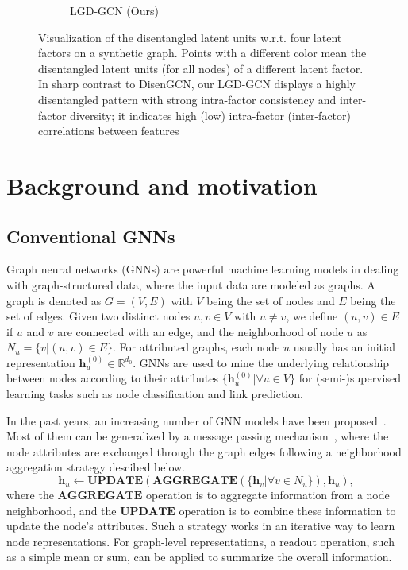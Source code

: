 \documentclass[accepted]{uai2021} %
\begin{document}
\begin{figure}[t]
\begin{subfigure}[b]{0.235\textwidth}
         \caption{\small{LGD-GCN (Ours)}}
         \label{fig:lgd_good}
     \end{subfigure}
\caption{Visualization of the disentangled latent units w.r.t. four latent factors on a synthetic graph. Points with a different color mean the disentangled latent units (for all nodes) of a different latent factor. In sharp contrast to DisenGCN, our LGD-GCN displays a highly disentangled pattern with strong intra-factor consistency and inter-factor diversity; it indicates high (low) intra-factor (inter-factor) correlations between features}
\label{fig:DisentangleSensi}
\end{figure}

\section{Background and motivation}
\subsection{Conventional GNNs}
Graph neural networks (GNNs) are powerful machine learning models in dealing with graph-structured data, where the input data are modeled as graphs. A graph is denoted as $G = (V, E)$ with $V$ being the set of nodes and $E$ being the set of edges. Given two distinct nodes $u, v \in V$ with $u \neq v$, we define $(u, v) \in E$ if $u$ and $v$ are connected with an edge, and the neighborhood of node $u$ as $N_u = \{v|(u,v) \in E\}$. For attributed graphs, each node $u$ usually has an initial representation $\mathbf{h}_u^{(0)} \in \mathbb{R}^{d_{0}}$. GNNs are used to mine the underlying relationship between nodes according to their attributes $\{\mathbf{h}_u^{(0)}| \forall u \in V \}$ for (semi-)supervised learning tasks such as node classification and link prediction.

In the past years, an increasing number of GNN models have been proposed~\citep{Wu2020ACS}. Most of them can be generalized by a message passing mechanism~\citep{gilmer2017neural}, where the node attributes are exchanged through the graph edges following a neighborhood aggregation strategy descibed below.
\begin{equation*}
\mathbf{h}_u \leftarrow \mathbf{UPDATE}(\mathbf{AGGREGATE}(\{\mathbf{h}_v| \forall v \in N_u\}),\mathbf{h}_u),
\end{equation*}
where the $\mathbf{AGGREGATE}$ operation is to aggregate information from a node neighborhood, and the $\mathbf{UPDATE}$ operation is to combine these information to update the node's attributes. Such a strategy works in an iterative way to learn node representations. For graph-level representations, a readout operation, such as a simple mean or sum, can be applied to summarize the overall information.
\end{document}

